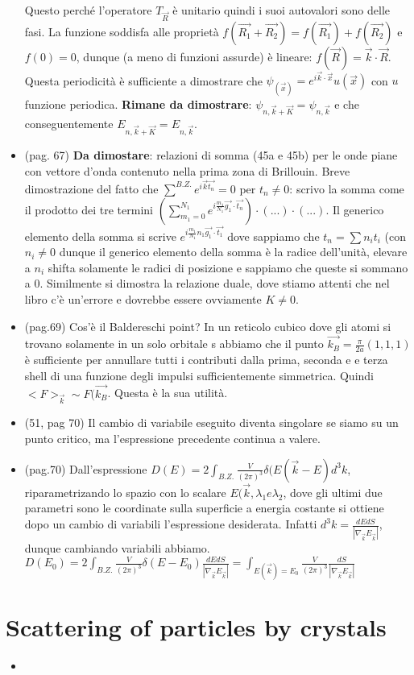 \documentclass[10pt,a4paper]{article}
\begin{document}
\begin{itemize}
Questo perché l'operatore $T_{\vec{R}}$ è unitario quindi i suoi autovalori sono delle fasi. La funzione soddisfa alle proprietà $f(\vec{R_1} + \vec{R_2}) = f(\vec{R_1}) + f(\vec{R_2})$ e $f(0) = 0$, dunque (a meno di funzioni assurde) è lineare: $f( \vec{R}) = \vec{k} \cdot \vec{R}$. 
Questa periodicità è sufficiente a dimostrare che $\psi_(\vec{x}) = e^{i \vec{k} \cdot \vec{x}} u(\vec{x})$ con $u$ funzione periodica. 
\textbf{Rimane da dimostrare}: $\psi_{n, \vec{k}+\vec{K}} = \psi_{n, \vec{k}}$ e che conseguentemente $E_{n, \vec{k} + \vec{K}} = E_{n, \vec{k}}$.
\item (pag. 67) \textbf{Da dimostare}: relazioni di somma (45a e 45b) per le onde piane con vettore d'onda contenuto nella prima zona di Brillouin. 
Breve dimostrazione del fatto che $\sum^{B.Z.} e^{i \vec{k} \vec{t_n}} = 0$ per $t_n \neq 0$: scrivo la somma come il prodotto dei tre termini $(\sum_{m_1 = 0}^{N_1} e^{i \frac{m_1}{N_1} \vec{g_1} \cdot \vec{t_n}}) \cdot (...) \cdot (...)$. 
Il generico elemento della somma si scrive $ e^{i \frac{m_1}{N_1} n_1 \vec{g_1} \cdot \vec{t_1}}$ dove sappiamo che $t_n = \sum n_i t_i$ (con $n_i \neq 0$ dunque il generico elemento della somma è la radice dell'unità, elevare a $n_i$ shifta solamente le radici di posizione e sappiamo che queste si sommano a 0. 
Similmente si dimostra la relazione duale, dove stiamo attenti che nel libro c'è un'errore e dovrebbe essere ovviamente $K \neq 0$.
\item (pag.69) Cos'è il Baldereschi point? In un reticolo cubico dove gli atomi si trovano solamente in un solo orbitale s abbiamo che il punto $\vec{k_B} = \frac{\pi}{2a} (1,1,1)$ è sufficiente per annullare tutti i contributi dalla prima, seconda e e terza shell di una funzione degli impulsi sufficientemente simmetrica. Quindi $<F>_{\vec{k}} \sim F(\vec{k_B}$. Questa è la sua utilità.
\item (51, pag 70) Il cambio di variabile eseguito diventa singolare se siamo su un punto critico, ma l'espressione precedente continua a valere.
\item (pag.70) Dall'espressione $D(E) = 2 \int_{B.Z.} \frac{V}{(2 \pi)^3} \delta(E(\vec{k}-E) d^3 k$, riparametrizando lo spazio con lo scalare $E(\vec{k}, \lambda_1 e \lambda_2$, 
dove gli ultimi due parametri sono le coordinate sulla superficie a energia costante si ottiene dopo un cambio di variabili l'espressione desiderata. Infatti $d^3k = \frac{dE dS}{|\nabla_{\vec{k}} E_{\vec{k}}|}$, dunque cambiando variabili abbiamo.
 $D(E_0) = 2  \int_{B.Z.} \frac{V}{(2 \pi)^3} \delta(E-E_0) \frac{dE dS}{|\nabla_{\vec{k}} E_{\vec{k}}|} = \int_{E(\vec{k})=E_0} \frac{V}{(2 \pi)^3} \frac{dS}{|\nabla_{\vec{k}} E_{\vec{k}}|}$ 
\end{itemize}
\section{Scattering of particles by crystals}
\begin{itemize}
\item 
\end{itemize}
\end{document}
